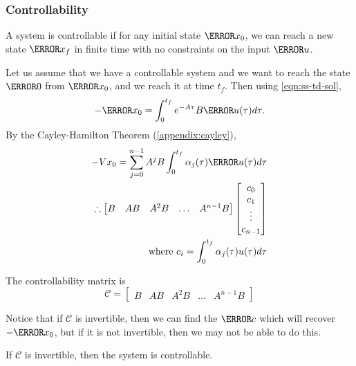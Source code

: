 \subsubsection{Controllability}
\begin{definition}
  A system is controllable if for any initial state $\V{x}_0$, we can reach a new state $\V{x}_f$ in finite time with no constraints on the input $\V{u}$.
  \label{defn:controllability}
\end{definition}
Let us assume that we have a controllable system and we want to reach the state $\V{0}$ from $\V{x}_0$, and we reach it at time $t_f$.
Then using \cref{eqn:ss-td-sol},
\[
  -\V{x}_0 = \int_0^{t_f} e^{-A\tau}B\V{u}(\tau)d\tau.
\]
By the Cayley-Hamilton Theorem (\cref{appendix:cayley}),
\begin{align*}
  -V{x}_0 = \sum_{j=0}^{n-1}A^jB\int_0^{t_f}\alpha_j(\tau)\V{u}(\tau)d\tau\\
  \therefore \begin{bmatrix} B & AB & A^2 B & \ldots & A^{n-1}B \end{bmatrix}
  \begin{bmatrix} c_0 \\ c_1 \\ \vdots \\ c_{n-1} \end{bmatrix}\\
  \text{where } c_i = \int_0^{t_f} \alpha_j(\tau)u(\tau)d\tau
\end{align*}
\begin{definition}
  The controllability matrix is
  \[
	\mathcal{C} = \begin{bmatrix} B & AB & A^2 B & \ldots & A^{n-1}B \end{bmatrix}
  \]
  \label{defn:controllability-matrix}
\end{definition}
Notice that if $\mathcal{C}$ is invertible, then we can find the $\V{c}$ which will recover $-\V{x}_0$, but if it is not invertible, then we may not be able to do this.
\begin{theorem}
  If $\mathcal{C}$ is invertible, then the system is controllable.
  \label{thm:controllability}
\end{theorem}
